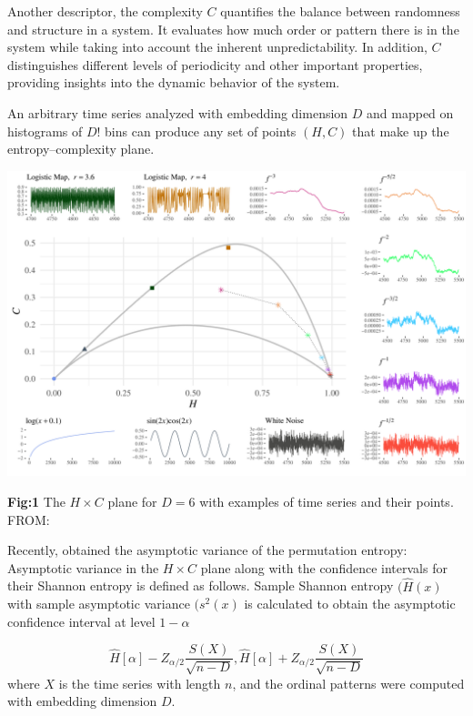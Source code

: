 \documentclass[a0,portrait]{a0poster}
\begin{document}
\begin{mdframed}[style=MyFrame]
\begin{multicols}{2}
Another descriptor, the complexity $C$ quantifies the balance between randomness and structure in a system. It evaluates how much order or pattern there is in the system while taking into account the inherent unpredictability. In addition, $C$ distinguishes different levels of periodicity and other important properties, providing insights into the dynamic behavior of the system.

An arbitrary time series analyzed with embedding dimension $D$ and mapped on histograms of $D!$ bins can produce any set of points $(H, C)$ that make up the entropy–complexity plane. 

\begin{minipage}{\columnwidth}
    \includegraphics[width=\linewidth]{AllSystems.pdf}
    
   \textbf{Fig:1} The $H\times C$ plane for $D=6$ with examples of time series and their points. FROM: \citet{chagas2022white}
\end{minipage}

Recently, \citet{REY2024115481} obtained the asymptotic variance of the permutation entropy: 
Asymptotic variance in the
$H \times C$ 
plane along with the confidence intervals for their Shannon entropy is defined as follows. Sample Shannon entropy 
$(\widehat{H}(x)$ 
with sample asymptotic variance 
$(s^2(x)$ 
is calculated to obtain the asymptotic confidence interval at level $1 − \alpha$

\begin{equation}
    \widehat{H}[\alpha]-Z_{\alpha/2} \frac{S(X)}{\sqrt{n-D}},  \widehat{H}[\alpha]+Z_{\alpha/2} \frac{S(X)}{\sqrt{n-D}}
    \label{eq:Asymptotic variance}
\end{equation}
where $X$ is the time series with length $n$, and the ordinal patterns were computed with embedding dimension $D$.  
 

\end{multicols}
\end{mdframed}
\end{document}
